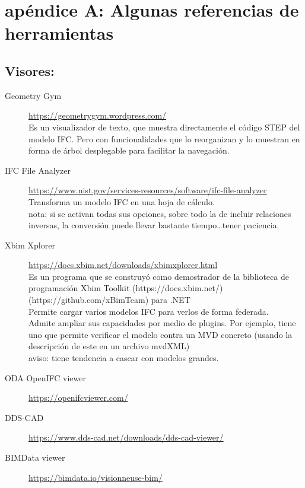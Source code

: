 \documentclass[spanish,12pt,a4paper,final,oneside]{book}
\begin{document}
\chapter{apéndice A: Algunas referencias de herramientas}

\section{Visores:}

\begin{description}

\item[Geometry Gym]
\url{https://geometrygym.wordpress.com/}
\\Es un visualizador de texto, que muestra directamente el código STEP del modelo IFC. Pero con funcionalidades que lo reorganizan y lo muestran en forma de árbol desplegable para facilitar la navegación.

\item[IFC File Analyzer]
\url{https://www.nist.gov/services-resources/software/ifc-file-analyzer}
\\Transforma un modelo IFC en una hoja de cálculo.
\\nota: si se activan todas sus opciones, sobre todo la de incluir relaciones inversas, la conversión puede llevar bastante tiempo\ldots tener paciencia.

\item[Xbim Xplorer]
\url{https://docs.xbim.net/downloads/xbimxplorer.html}
\\Es un programa que se construyó como demostrador de la biblioteca de programación Xbim Toolkit (https://docs.xbim.net/) (https://github.com/xBimTeam) para .NET
\\Permite cargar varios modelos IFC para verlos de forma federada.
\\Admite ampliar sus capacidades por medio de plugins. Por ejemplo, tiene uno que permite verificar el modelo contra un MVD concreto ({\footnotesize usando la descripción de este en un archivo mvdXML})
\\aviso: tiene tendencia a cascar con modelos grandes.

\item[ODA OpenIFC viewer]
\url{https://openifcviewer.com/}

\item[DDS-CAD]
\url{https://www.dds-cad.net/downloads/dds-cad-viewer/}

\item[BIMData viewer]
\url{https://bimdata.io/visionneuse-bim/}


\end{description}
\end{document}
